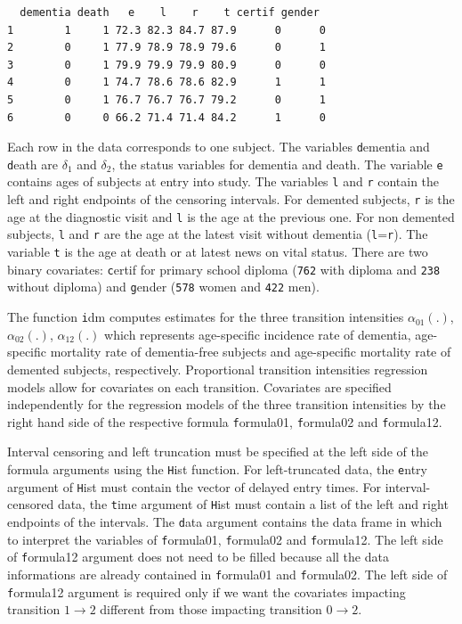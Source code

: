 \documentclass{article}
\newcommand{\code}[1]{{\texttt #1}}
\begin{document}
\begin{verbatim}
  dementia death   e    l    r    t certif gender
1        1     1 72.3 82.3 84.7 87.9      0      0
2        0     1 77.9 78.9 78.9 79.6      0      1
3        0     1 79.9 79.9 79.9 80.9      0      0
4        0     1 74.7 78.6 78.6 82.9      1      1
5        0     1 76.7 76.7 76.7 79.2      0      1
6        0     0 66.2 71.4 71.4 84.2      1      0
\end{verbatim}

Each row in the data corresponds to one subject.  The variables
\code{dementia} and \code{death} are  $\delta_1$ and $\delta_2$, 
the status variables for dementia and death.
The variable \code{e} contains ages of subjects at entry into
study. The variables \code{l} and \code{r} contain the left and right
endpoints of the censoring intervals.  For demented subjects, \code{r}
is the age at the diagnostic visit and \code{l} is the age at the
previous one.  For non demented subjects, \code{l} and \code{r} are
the age at the latest visit without dementia (\code{l}=\code{r}).  The
variable \code{t} is the age at death or at latest news on vital
status.  There are two binary covariates: \code{certif} for primary
school diploma (\texttt{762} with diploma and \texttt{238}
without diploma) and \code{gender} (\texttt{578} women and
\texttt{422} men).

The function \code{idm} computes estimates for the three transition
intensities $\alpha_{01}(.)$, $\alpha_{02}(.)$, $\alpha_{12}(.)$ which
represents age-specific incidence rate of dementia, age-specific mortality
rate of dementia-free subjects and age-specific mortality rate of
demented subjects, respectively.  Proportional transition intensities
regression models allow for covariates on each transition.
Covariates are specified independently for the regression models of
the three transition intensities by the right hand side of the
respective formula \code{formula01}, \code{formula02} and
\code{formula12}.

Interval censoring and left truncation must be specified at the left
side of the formula arguments using the \code{Hist} function.  For
left-truncated data, the \code{entry} argument of \code{Hist} must
contain the vector of delayed entry times.  For interval-censored
data, the \code{time} argument of \code{Hist} must contain a list of
the left and right endpoints of the intervals.
The \code{data} argument contains the data frame in which to
interpret the variables of \code{formula01}, \code{formula02} and
\code{formula12}.
The left side of \code{formula12} argument does not need to be filled because all the data 
informations are already contained in \code{formula01} and \code{formula02}.
The left side of \code{formula12} argument is required only if we want the covariates 
impacting 
transition $1 \rightarrow 2$ different from those impacting transition 
$0 \rightarrow 2$.
\end{document}
